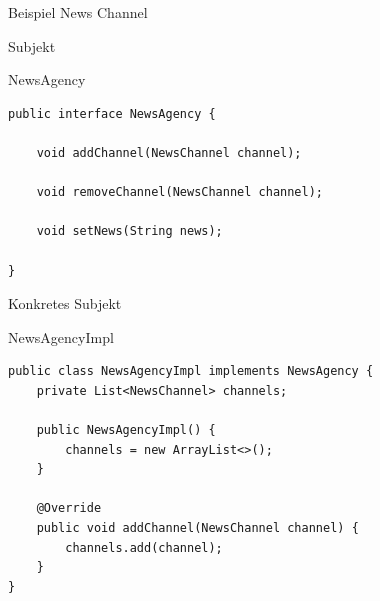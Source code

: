 \begin{frame}{Beispiel News Channel}
\end{frame}

\begin{frame}[fragile]{Subjekt}
	\begin{exampleblock}{NewsAgency}
 		\begin{lstlisting}
public interface NewsAgency {

	void addChannel(NewsChannel channel);

	void removeChannel(NewsChannel channel);

	void setNews(String news);

}
 		\end{lstlisting}
 	\end{exampleblock}
\end{frame}

\begin{frame}[fragile]{Konkretes Subjekt}
	\begin{exampleblock}{NewsAgencyImpl}
 		\begin{lstlisting}
public class NewsAgencyImpl implements NewsAgency {
	private List<NewsChannel> channels;
	
	public NewsAgencyImpl() {
		channels = new ArrayList<>();
	}
	
	@Override
	public void addChannel(NewsChannel channel) {
		channels.add(channel);
	}
} 		    
 		\end{lstlisting}
 	\end{exampleblock}
\end{frame}

